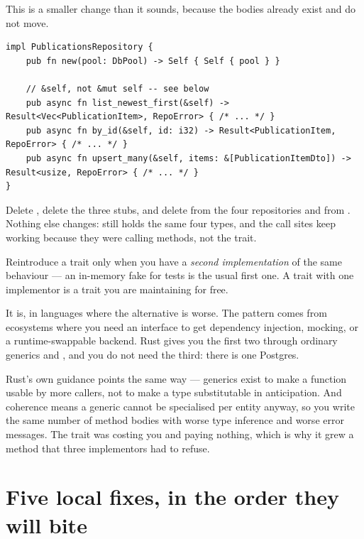 \begin{pattern}
This is a smaller change than it sounds, because the bodies already exist and do not move.
\begin{lstlisting}[style=rs,caption={\file{src/publications/repository.rs} --- inherent methods, no trait.}]
impl PublicationsRepository {
    pub fn new(pool: DbPool) -> Self { Self { pool } }

    // &self, not &mut self -- see below
    pub async fn list_newest_first(&self) -> Result<Vec<PublicationItem>, RepoError> { /* ... */ }
    pub async fn by_id(&self, id: i32) -> Result<PublicationItem, RepoError> { /* ... */ }
    pub async fn upsert_many(&self, items: &[PublicationItemDto]) -> Result<usize, RepoError> { /* ... */ }
}
\end{lstlisting}
Delete , delete the three  stubs, and delete
 from the four repositories and from
. Nothing else changes:  still holds the same four
types, and the call sites keep working because they were calling methods, not the trait.

Reintroduce a trait only when you have a \emph{second implementation} of the same behaviour --- an
in-memory fake for tests is the usual first one. A trait with one implementor is a trait you are
maintaining for free.
\end{pattern}

\begin{why}
It is, in languages where the alternative is worse. The pattern comes from ecosystems where you need
an interface to get dependency injection, mocking, or a runtime-swappable backend. Rust gives you
the first two through ordinary generics and , and you do not need the third: there
is one Postgres.

Rust's own guidance points the same way --- generics exist to make a function usable by more callers,
not to make a type substitutable in anticipation. And coherence means a generic
 cannot be specialised per entity anyway, so you write the same number of method
bodies with worse type inference and worse error messages. The trait was costing you and paying
nothing, which is why it grew a method that three implementors had to refuse.
\end{why}

\section{Five local fixes, in the order they will bite}

